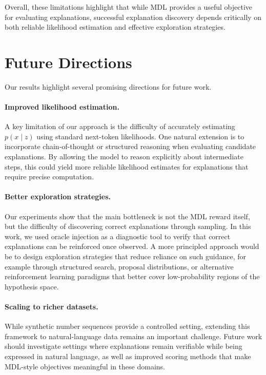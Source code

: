 \documentclass{article}
\theoremstyle{plain}
\theoremstyle{definition}
\theoremstyle{remark}
\begin{document}
Overall, these limitations highlight that while MDL provides a useful objective for evaluating explanations, successful explanation discovery depends critically on both reliable likelihood estimation and effective exploration strategies.

\section{Future Directions}

Our results highlight several promising directions for future work.
\paragraph{Improved likelihood estimation.}
A key limitation of our approach is the difficulty of accurately estimating $p(x \mid z)$ using standard next-token likelihoods. One natural extension is to incorporate chain-of-thought or structured reasoning when evaluating candidate explanations. By allowing the model to reason explicitly about intermediate steps, this could yield more reliable likelihood estimates for explanations that require precise computation.

\paragraph{Better exploration strategies.}
Our experiments show that the main bottleneck is not the MDL reward itself, but the difficulty of discovering correct explanations through sampling. In this work, we used oracle injection as a diagnostic tool to verify that correct explanations can be reinforced once observed. A more principled approach would be to design exploration strategies that reduce reliance on such guidance, for example through structured search, proposal distributions, or alternative reinforcement learning paradigms that better cover low-probability regions of the hypothesis space.

\paragraph{Scaling to richer datasets.}
While synthetic number sequences provide a controlled setting, extending this framework to natural-language data remains an important challenge. Future work should investigate settings where explanations remain verifiable while being expressed in natural language, as well as improved scoring methods that make MDL-style objectives meaningful in these domains.
\end{document}
